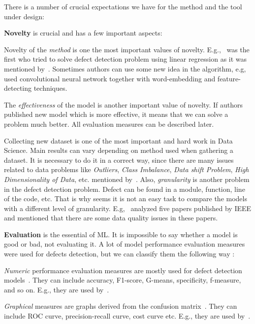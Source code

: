 There is a number of crucial expectations we have for the
method and the tool under design:

\textbf{Novelty} is crucial and has a few important aspects:
\begin{enumerate*}
\item 
Novelty of the \emph{method} is one the most important values of novelty. 
E.g.,~\citet{Akiyama1971AnEO} was the first who 
tried to solve defect detection problem using 
linear regression as it was mentioned by~\citet{7476771}.
Sometimes authors can use some new idea in the 
algorithm, e.g,~\citet{XIAO201917} used convolutional neural network
together with word-embedding and feature-detecting techniques.

\item
The \emph{effectiveness} of the model is another important 
value of novelty. If authors published new model which 
is more effective, it means that we can solve a problem 
much better. All evaluation measures can be described later.

\item
Collecting new dataset is one of the most important and hard work in Data Science. 
Main results can vary depending on method used when gathering a dataset. 
It is necessary to do it in a correct way, since there are many issues related 
to data problems like \emph{Outliers}, \emph{Class Imbalance}, \emph{Data shift Problem}, 
\emph{High Dimensionality of Data}, etc. mentioned by~\citet{10.1007/s10462-017-9563-5}.
Also, \emph{granularity} is another problem in the 
defect detection problem. Defect can be found in a module, 
function, line of the code, etc. That is why seems 
it is not an easy task to compare the models with a
different level of granularity.
E.g,~\citet{6464273} analyzed five papers published by 
IEEE and mentioned that there are some data 
quality issues in these papers.
\end{enumerate*}

\textbf{Evaluation} is the essential of ML. It is impossible 
to say whether a model is good or bad, not evaluating it. 
A lot of model performance evaluation measures were used 
for defects detection, but we can 
classify them the following way \citep{10.1007/s10462-017-9563-5, Jiang2008}:
\begin{enumerate*}[label=\arabic*)]
\item \emph{Numeric} performance evaluation measures
are mostly used for defect detection models~\citep{Jiang2008}. 
They can include accuracy, F1-score, G-means, specificity, 
f-measure, and so on. E.g., they are used by~\citet{6349519}. 
\item \emph{Graphical} measures are graphs derived from 
the confusion matrix~\citep{Jiang2008}. 
They can include ROC curve, precision-recall curve, cost curve etc. 
E.g., they are used by~\citet{SHATNAWI20081868}.
\end{enumerate*}

